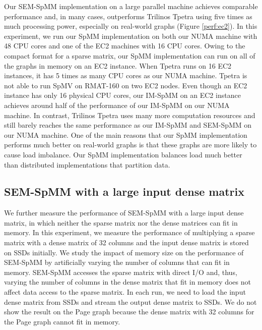 Our SEM-SpMM implementation on a large parallel machine achieves comparable
performance and, in many cases, outperforms Trilinos Tpetra using five times
as much processing power, especially on
real-world graphs (Figure \ref{perf:ec2}). In this experiment, we run our
SpMM implementation on both our NUMA machine with 48 CPU cores
and one of the EC2 machines with 16 CPU cores. Owing to the compact format
for a sparse matrix, our SpMM implementation can run on all of the graphs
in memory on an EC2 instance. When Tpetra runs on 16 EC2 instances, it has
5 times as many CPU cores as our NUMA machine. Tpetra is not
able to run SpMV on RMAT-160 on two EC2 nodes. Even though an EC2 instance
has only 16 physical CPU cores, our IM-SpMM on an EC2 instance achieves around
half of the performance of our IM-SpMM on our NUMA machine. In contrast,
Trilinos Tpetra uses many more computation resources and still barely reaches
the same performance as our IM-SpMM and SEM-SpMM on our NUMA machine. One of
the main reasons that our SpMM implementation performs much
better on real-world graphs is that these graphs are more likely to cause
load imbalance. Our SpMM implementation balances load much better than
distributed implementations that partition data.

\subsection{SEM-SpMM with a large input dense matrix}

We further measure the performance of SEM-SpMM with a large input dense matrix,
in which neither the sparse matrix nor the dense matrices can fit in memory.
In this experiment, we measure the performance of multiplying a sparse matrix
with a dense matrix of 32 columns and the input dense matrix is stored on SSDs
initially. We study the impact of memory size on the performance of SEM-SpMM
by artificially varying the number of columns that can fit in memory. SEM-SpMM
accesses
the sparse matrix with direct I/O and, thus, varying the number of columns
in the dense matrix that fit in memory does not affect data access to the
sparse matrix. In each run, we need to load the input dense matrix from
SSDs and stream the output dense matrix to SSDs. We do not show the result on
the Page graph because the dense matrix with 32 columns for the Page graph
cannot fit in memory.

